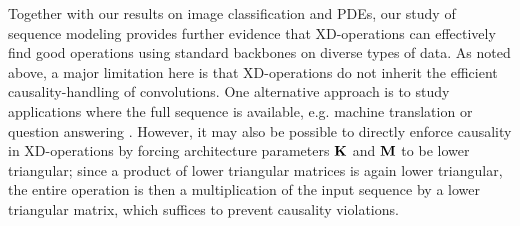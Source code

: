 Together with our results on image classification and PDEs, our study of sequence modeling provides further evidence that XD-operations can effectively find good operations using standard backbones on diverse types of data.
As noted above, a major limitation here is that XD-operations do not inherit the efficient causality-handling of convolutions.
One alternative approach is to study applications where the full sequence is available, e.g. machine translation \citep{stahlberg2020nmt} or question answering \citep{rajpurkar2016squad}.
However, it may also be possible to directly enforce causality in XD-operations by forcing architecture parameters $\mathbf{K}$ and $\mathbf{M}$ to be lower triangular;
since a product of lower triangular matrices is again lower triangular, the entire operation is then a multiplication of the input sequence by a lower triangular matrix, which suffices to prevent causality violations.
